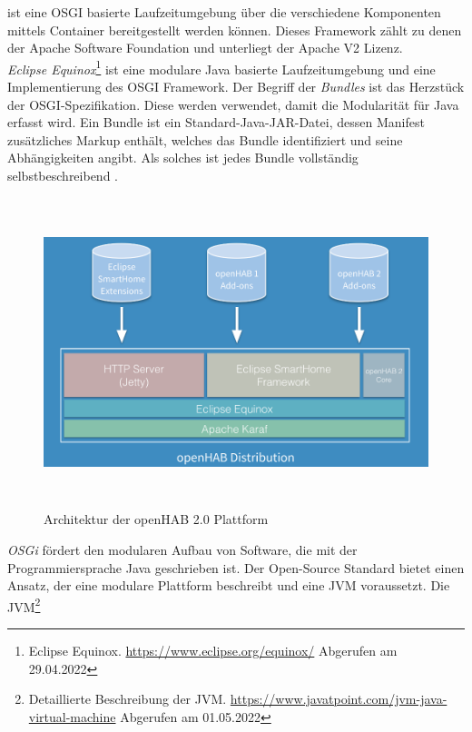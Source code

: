     ist eine \acs{OSGI} basierte Laufzeitumgebung über die verschiedene Komponenten mittels Container 
    bereitgestellt werden können. Dieses Framework zählt zu denen der Apache Software Foundation und unterliegt der Apache V2 Lizenz.
    \\
    \linebreak
    \textit{Eclipse Equinox}\footnote{Eclipse Equinox. \url{https://www.eclipse.org/equinox/} Abgerufen am 29.04.2022} ist eine modulare 
    Java basierte Laufzeitumgebung und eine Implementierung des \acs{OSGI} Framework. Der Begriff der \textit{Bundles} ist das 
    Herzstück der \acs{OSGI}-Spezifikation. Diese werden verwendet, damit die Modularität für Java erfasst wird. Ein Bundle ist 
    ein Standard-Java-JAR-Datei, dessen Manifest zusätzliches Markup enthält, welches das Bundle identifiziert und seine Abhängigkeiten 
    angibt. Als solches ist jedes Bundle vollständig selbstbeschreibend \cite{openHAB-article}. 
    \begin{figure}[hbt!]
        \centering
        \includegraphics[width=15cm,height=9cm,keepaspectratio]{images/openhab-2-architecture.png}
        \caption{Architektur der openHAB 2.0 Plattform \cite{kaikreutzer2016}}
        \label{fig:architectureopenHAB2}
    \end{figure}
    \textit{OSGi} fördert den modularen Aufbau von Software, die mit der Programmiersprache Java geschrieben ist. Der Open-Source 
    Standard bietet einen Ansatz, der eine modulare Plattform beschreibt und eine \ac{JVM} voraussetzt. Die \acl{JVM}\footnote{Detaillierte Beschreibung der JVM. \url{https://www.javatpoint.com/jvm-java-virtual-machine} Abgerufen am 01.05.2022} 
